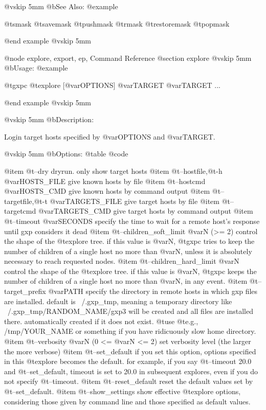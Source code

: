 @vskip 5mm
@b{See Also:}
@example

  @t{smask} @t{savemask} @t{pushmask} @t{rmask} @t{restoremask} @t{popmask}

@end example
@vskip 5mm

@node explore, export, ep, Command Reference
@section explore
@vskip 5mm
@b{Usage:}
@example

  @t{gxpc} @t{explore} [@var{OPTIONS}] @var{TARGET} @var{TARGET} ...

@end example
@vskip 5mm

@vskip 5mm
@b{Description:}


  Login target hosts specified by @var{OPTIONS} and @var{TARGET}.

@vskip 5mm
@b{Options:}
@table @code

@item   @t{--dry}
    dryrun. only show target hosts
@item   @t{--hostfile},@t{-h} @var{HOSTS_FILE}
    give known hosts by file
@item   @t{--hostcmd} @var{HOSTS_CMD}
    give known hosts by command output
@item   @t{--targetfile},@t{-t} @var{TARGETS_FILE}
    give target hosts by file
@item   @t{--targetcmd} @var{TARGETS_CMD}
    give target hosts by command output
@item   @t{--timeout} @var{SECONDS}
    specify the time to wait for a remote host's response
    until gxp considers it dead
@item   @t{--children_soft_limit} @var{N} (>= 2)
    control the shape of the @t{explore} tree. if this value is @var{N}, @t{gxpc}
    tries to keep the number of children of a single host no more than @var{N},
    unless it is absolutely necessary to reach requested nodes.
@item   @t{--children_hard_limit} @var{N}
    control the shape of the @t{explore} tree. if this value is @var{N}, @t{gxpc}
    keeps the number of children of a single host no more than @var{N}, in any event.
@item   @t{--target_prefix} @var{PATH}
    specify the directory in remote hosts in which gxp files are installed.
    default is ~/.gxp_tmp, meaning a temporary directory like
    ~/.gxp_tmp/RANDOM_NAME/gxp3 will be created and all files are installed
    there. automatically created if it does not exist. @t{use} @t{e}.g., /tmp/YOUR_NAME
    or something if you have ridicuously slow home directory.
@item   @t{--verbosity} @var{N} (0 <= @var{N} <= 2)
    set verbosity level (the larger the more verbose)
@item   @t{--set_default}
    if you set this option, options specified in this @t{explore} becomes the default.
    for example, if you say @t{--timeout} 20.0 and @t{--set_default}, timeout is set to
    20.0 in subsequent explores, even if you do not specify @t{--timeout}.
@item   @t{--reset_default}
    reset the default values set by @t{--set_default}.
@item   @t{--show_settings}
    show effective @t{explore} options, considering those given by command line and
    those specified as default values.

